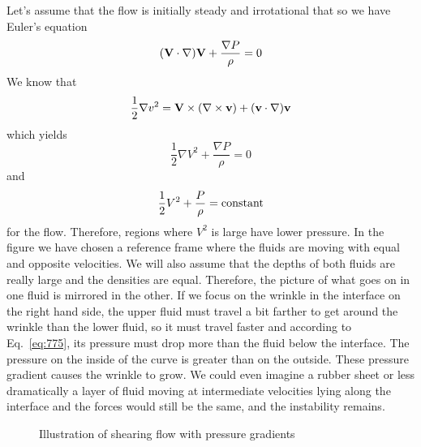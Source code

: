 Let's assume that the flow is initially steady and
irrotational that so we have Euler's equation
\begin{equation}
({\bf V} \cdot \nabla) {\bf V} + \frac{\nabla P}{\rho} = 0
\label{eq:772}
\end{equation}
We know that 
\begin{equation}
\frac{1}{2} \nabla v^2 = {\bf V} \times (\nabla \times {\bf v}) + ({\bf
  v} \cdot \nabla ) {\bf v}
\label{eq:773}
\end{equation}
which yields
\begin{equation}
\frac{1}{2} \nabla V^2 + \frac{\nabla P}{\rho} = 0
\label{eq:774}
\end{equation}
and
\begin{equation}
\frac{1}{2} V^2 + \frac{P}{\rho} = \hbox{\rm constant}
\label{eq:775}
\end{equation}
for the flow.  Therefore, regions where $V^2$ is large have lower
pressure.  In the figure we have chosen a reference frame where the fluids
are moving with equal and opposite velocities.   We will also assume
that the depths of both fluids are really large and the densities are
equal.  Therefore, the picture of what goes on in one fluid is
mirrored in the other.    If we focus on the wrinkle in the interface
on the right hand side, the upper fluid must travel a bit farther to
get around the wrinkle than the lower fluid, so it must travel faster
and according to Eq.~\ref{eq:775}, its pressure must drop more than
the fluid below the interface.   The pressure on the inside of the
curve is greater than on the outside.  These pressure gradient causes
the wrinkle to grow.    We could even imagine a rubber sheet or less
dramatically a layer of fluid moving at intermediate velocities lying
along the interface and the forces would still be the same, and the
instability remains.

\begin{figure}
\begin{center}
\end{center}
\caption{Illustration of shearing flow with pressure gradients}
\end{figure}

